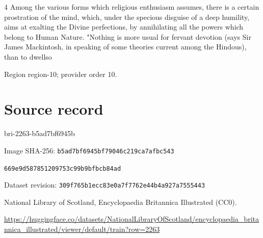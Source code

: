\documentclass[11pt]{article}
\begin{document}
4 Among the various forms which religious enthusiasm assumes, there is a certain prostration of the mind, which, under the specious disguise of a deep humility, aims at exalting the Divine perfections, by annihilating all the powers which belong to Human Nature. "Nothing is more usual for fervant devotion (says Sir James Mackintosh, in speaking of some theories current among the Hindous), than to dwellso
\par

{\scriptsize\color{gray} Region region-10; provider order 10.\par}
\medskip
\newpage\section*{Source record}
bri-2263-b5ad7bf6945b\par
Image SHA-256: \texttt{b5ad7bf6945bf79046c219ca7afbc543}\par\texttt{669e9d587851209753c99b9bfbcb84ad}\par
Dataset revision: \texttt{309f765b1ecc83e0a7f7}\texttt{762e44b4a927a7555443}\par
National Library of Scotland, Encyclopaedia Britannica Illustrated (CC0).\par
\url{https://huggingface.co/datasets/NationalLibraryOfScotland/encyclopaedia_britannica_illustrated/viewer/default/train?row=2263}
\end{document}

